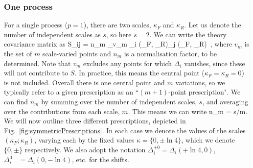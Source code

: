 \subsubsection{One process}
For a single process ($p=1$), there are two scales, $\kappa_F$ and $\kappa_R$. Let us denote the number of independent scales as $s$, so here $s=2$. We can write the theory covariance matrix as
\be 
  S_{ij} = n_{m} \sum_{v_{m}} \Delta_{i} (\kappa_F, \kappa_R)\Delta_{j} (\kappa_F, \kappa_R)\, ,
\ee
where $v_m$ is the set of $m$ scale-varied points and $n_m$ is a normalisation factor, to be determined. Note that $v_m$ excludes any points for which $\Delta_i$ vanishes, since these will not contribute to $S$. In practice, this means the central point ($\kappa_F = \kappa_R = 0$) is not included. Overall there is one central point and $m$ variations, so we typically refer to a given prescription as an ``$(m+1)$-point prescription". We can find $n_m$ by summing over the number of independent scales, $s$, and averaging over the contributions from each scale, $m$. This means we can write
\be
n_m = s/m.
\ee
We will now outline three different prescriptions, depicted in Fig.~\ref{fig:symmetricPrescriptions}. In each case we denote the values of the scales $(\kappa_F; \kappa_R)$, varying each by the fixed values $\kappa = \{0, \pm \ln 4\}$, which we denote $\{0, \pm\}$ respectively. We also adopt the notation $\Delta_i^{+0}=\Delta_i(+\ln 4,0)$, $\Delta_i^{0-}=\Delta_i(0,-\ln4 )$, etc. for the shifts.
